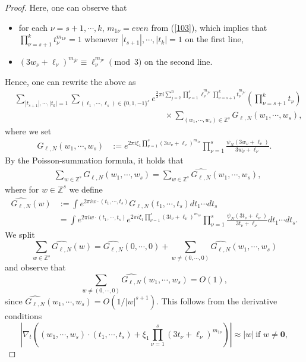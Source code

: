 \documentclass[11 pt,letterpaper]{amsart}
\theoremstyle{plain}
\theoremstyle{definition}
\theoremstyle{remark} \theoremstyle{exam} \theoremstyle{ob}
\numberwithin{equation}{section}
\begin{document}
\begin{proof}
Here, one can observe that
\begin{itemize}
\item for each $\nu=s+1,\cdots,k$, $m_{1\nu}=even$ from (\ref{103}), which implies that  $\prod_{\nu=s+1}^k t_\nu^{m_{1\nu}}=1$ whenever $|t_{s+1}|,\cdots,|t_k|=1$  on the first line,
\item $(3w_\nu+\ell_\nu)^{m_{j\nu}}\equiv \ell_\nu^{m_{j\nu}} \pmod{3}$ on the second line.
\end{itemize}
Hence, one can rewrite the above as
\begin{align*}
&\sum_{|t_{s+1}|,\cdots,|t_k|=1}  \sum_{(\ell_1,\cdots,\ell_s)\in\{0,1,-1\}^s} e^{\frac{2}{3}\pi i 
 \sum_{j=2}^n \prod_{\nu=1}^s \ell_\nu^{m_{j\nu}} \prod_{\nu=s+1}^k t_\nu^{m_{j\nu}}  }\left(\prod_{\nu=s+1}^k t_{\nu}\right)\\
&\qquad\qquad\qquad\qquad\qquad\qquad\qquad\qquad\qquad \times\sum_{(w_1,\cdots,w_s)\in \mathbb{Z}^s}
 G_{\ell,N}(w_1,\cdots,w_s),
\end{align*}
where we set
\begin{align}
G_{\ell,N}(w_1,\cdots,w_s)&:= e^{2\pi i \xi_1 \prod_{\nu=1}^s(3w_\nu+\ell_\nu)^{m_{1\nu}} } \prod_{\nu=1}^s\frac{\psi_{N}(3w_\nu+\ell_\nu)}{3w_\nu+\ell_\nu}.\nonumber
\end{align}
		By the Poisson-summation formula, it holds that
\begin{align*}
&\sum_{w\in \mathbb{Z}^s} G_{\ell,N}(w_1,\cdots,w_s)=\sum_{w\in \mathbb{Z}^s} \widehat{G_{\ell,N}}(w_1,\cdots,w_s),\end{align*}
where for $w\in \mathbb{Z}^s$ we define
\begin{align*}
\widehat{G_{\ell,N}}(w)&:=\int e^{2\pi i w\cdot (t_1,\cdots,t_s)} G_{\ell,N}(t_1,\cdots,t_s) dt_1\cdots dt_s\\
& = \int e^{2\pi i w\cdot (t_1,\cdots,t_s)}  e^{2\pi i \xi_1 \prod_{\nu=1}^s(3t_\nu+\ell_\nu)^{m_{1\nu}} } \prod_{\nu=1}^s\frac{\psi_{N}(3t_\nu+\ell_\nu)}{3t_\nu+\ell_\nu}dt_1\cdots dt_s.
		\end{align*}
	We split
	$$\sum_{w\in \mathbb{Z}^s} \widehat{G_{\ell,N}}(w)=\widehat{G_{\ell,N}}(0,\cdots,0)+\sum_{w\ne (0,\cdots,0)} \widehat{G_{\ell,N}}(w_1,\cdots,w_s)$$
	and observe that 
	$$\sum_{w\ne (0,\cdots, 0)} \widehat{G_{\ell,N}}(w_1,\cdots,w_s)=O(1),$$
since $ \widehat{G_{\ell,N}}(w_1,\cdots,w_s)=O(1/|w|^{s+1})$. This follows from the derivative conditions 
$$\left|\nabla_{t} \left((w_1,\cdots,w_s)\cdot (t_1,\cdots,t_s)+ \xi_1 \prod_{\nu=1}^s(3t_\nu+\ell_\nu)^{m_{1\nu}}\right)\right|\approx |w|\ \text{if $w\ne \textbf{0}$},$$

\end{proof}
\end{document}
